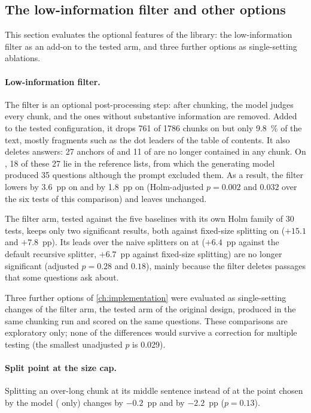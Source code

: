 \subsection*{The low-information filter and other options}
\label{sec:filter}

This section evaluates the optional features of the library: the low-information filter
as an add-on to the tested arm, and three further options as single-setting ablations.

\paragraph{Low-information filter.} The filter is an optional post-processing step: after
chunking, the model judges every chunk, and the ones without substantive information are removed. Added to the tested
configuration, it drops 761 of \num{1786} chunks on  but only
\SI{9.8}{\percent} of the text, mostly fragments such as the dot leaders of the table of
contents. It also deletes answers: 27 anchors of  and 11 of  are
no longer contained in any chunk. On , 18 of these 27 lie in the reference
lists, from which the generating model produced 35 questions although the prompt excluded
them. As a result, the filter lowers  by 3.6~pp on  and by 1.8~pp on
 (Holm-adjusted $p = 0.002$ and $0.032$ over the six tests of this
comparison) and leaves  unchanged.

The filter arm, tested against the five baselines with its own Holm family of 30 tests,
keeps only two significant results, both against fixed-size splitting on 
($+15.1$ and $+7.8$~pp). Its leads over the naive splitters on  at 
($+6.4$~pp against the default recursive splitter, $+6.7$~pp against fixed-size splitting)
are no longer significant (adjusted $p = 0.28$ and $0.18$), mainly because the filter
deletes passages that some questions ask about.

\label{sec:ablations}
Three further options of \cref{ch:implementation} were evaluated as single-setting changes
of the filter arm, the tested arm of the original design, produced in the same chunking run and
scored on the same questions. These comparisons are exploratory only; none of the
differences would survive a correction for multiple testing (the smallest unadjusted $p$
is 0.029).

\paragraph{Split point at the size cap.} Splitting an over-long chunk at its middle
sentence instead of at the point chosen by the model ( only) changes 
by $-0.2$~pp and  by $-2.2$~pp ($p = 0.13$).

